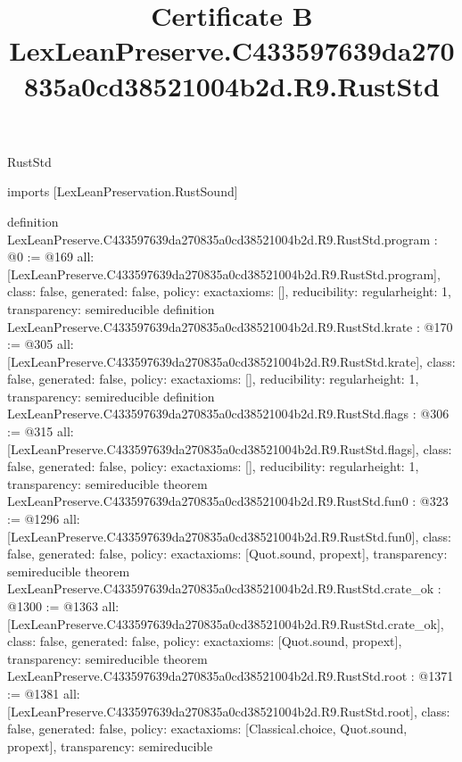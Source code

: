 \begin{lexlean}{RustStd}
\title{Certificate B LexLeanPreserve.C433597639da270835a0cd38521004b2d.R9.RustStd}
\begin{coremodule}
imports [LexLeanPreservation.RustSound]

definition LexLeanPreserve.C433597639da270835a0cd38521004b2d.R9.RustStd.program : @0 := @169 {
  all: [LexLeanPreserve.C433597639da270835a0cd38521004b2d.R9.RustStd.program],
  class: false,
  generated: false,
  policy: exact{axioms: []},
  reducibility: regular{height: 1},
  transparency: semireducible
}
definition LexLeanPreserve.C433597639da270835a0cd38521004b2d.R9.RustStd.krate : @170 := @305 {
  all: [LexLeanPreserve.C433597639da270835a0cd38521004b2d.R9.RustStd.krate],
  class: false,
  generated: false,
  policy: exact{axioms: []},
  reducibility: regular{height: 1},
  transparency: semireducible
}
definition LexLeanPreserve.C433597639da270835a0cd38521004b2d.R9.RustStd.flags : @306 := @315 {
  all: [LexLeanPreserve.C433597639da270835a0cd38521004b2d.R9.RustStd.flags],
  class: false,
  generated: false,
  policy: exact{axioms: []},
  reducibility: regular{height: 1},
  transparency: semireducible
}
theorem LexLeanPreserve.C433597639da270835a0cd38521004b2d.R9.RustStd.fun0 : @323 := @1296 {
  all: [LexLeanPreserve.C433597639da270835a0cd38521004b2d.R9.RustStd.fun0],
  class: false,
  generated: false,
  policy: exact{axioms: [Quot.sound, propext]},
  transparency: semireducible
}
theorem LexLeanPreserve.C433597639da270835a0cd38521004b2d.R9.RustStd.crate_ok : @1300 := @1363 {
  all: [LexLeanPreserve.C433597639da270835a0cd38521004b2d.R9.RustStd.crate_ok],
  class: false,
  generated: false,
  policy: exact{axioms: [Quot.sound, propext]},
  transparency: semireducible
}
theorem LexLeanPreserve.C433597639da270835a0cd38521004b2d.R9.RustStd.root : @1371 := @1381 {
  all: [LexLeanPreserve.C433597639da270835a0cd38521004b2d.R9.RustStd.root],
  class: false,
  generated: false,
  policy: exact{axioms: [Classical.choice, Quot.sound, propext]},
  transparency: semireducible
}


\end{coremodule}
\end{lexlean}
